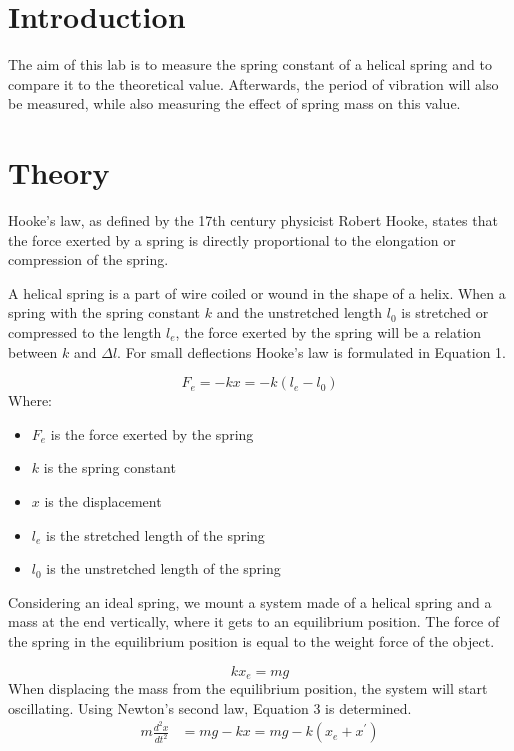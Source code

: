 \documentclass[a4paper, 10pt]{article}
\begin{document}
\begin{justify}
\section{Introduction}
The aim of this lab is to measure the spring constant of a helical spring and to
compare it to the theoretical value. Afterwards, the period of vibration will also be
measured, while also measuring the effect of spring mass on this value.
\section{Theory}
Hooke's law, as defined by the 17th century physicist Robert Hooke, states that
the force exerted by a spring is directly proportional to the elongation or
compression of the spring.
\par
A helical spring is a part of wire coiled or wound in the shape of a helix. When
a spring with the spring constant $k$ and the unstretched length $l_0$ is
stretched or compressed to the length $l_e$, the force exerted by the spring
will be a relation between $k$ and $\Delta l$. For small deflections Hooke's law
is formulated in Equation 1.
\par
\begin{equation}
    F_e = -kx = -k(l_e - l_0)
\end{equation}
Where:
\begin{itemize}
    \item $F_e$ is the force exerted by the spring
    \item $k$ is the spring constant
    \item $x$ is the displacement
    \item $l_e$ is the stretched length of the spring
    \item $l_0$ is the unstretched length of the spring
\end{itemize}
Considering an ideal spring, we mount a system made of a helical spring and a
mass at the end vertically, where it gets to an equilibrium position. The force
of the spring in the equilibrium position is equal to the weight force of the
object.
\par
\begin{equation}  \label{eq:2}
    k x_e = mg 
\end{equation}
When displacing the mass from the equilibrium position, the system will start
oscillating.
Using Newton's second law, Equation 3 is determined.
\begin{align} 
    m \frac{d^2 x}{d t^2} &= mg - kx = mg - k (x_e + x^{\prime}) \\

\end{align}
\end{justify}
\end{document}

